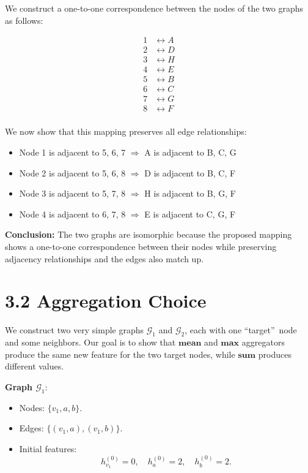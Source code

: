 \documentclass[a4paper,12pt]{article}
\begin{document}
We construct a one-to-one correspondence between the nodes of the two graphs as follows:

\[
\begin{aligned}
1 &\leftrightarrow A \\
2 &\leftrightarrow D \\
3 &\leftrightarrow H \\
4 &\leftrightarrow E \\
5 &\leftrightarrow B \\
6 &\leftrightarrow C \\
7 &\leftrightarrow G \\
8 &\leftrightarrow F \\
\end{aligned}
\]

We now show that this mapping preserves all edge relationships:

\begin{itemize}
    \item Node 1 is adjacent to 5, 6, 7 \(\Rightarrow\) A is adjacent to B, C, G
    \item Node 2 is adjacent to 5, 6, 8 \(\Rightarrow\) D is adjacent to B, C, F
    \item Node 3 is adjacent to 5, 7, 8 \(\Rightarrow\) H is adjacent to B, G, F
    \item Node 4 is adjacent to 6, 7, 8 \(\Rightarrow\) E is adjacent to C, G, F
\end{itemize}

\textbf{Conclusion:} The two graphs are isomorphic because the proposed mapping shows a one-to-one correspondence between their nodes while preserving adjacency relationships and the edges also match up.



\section*{3.2 Aggregation Choice}

We construct two very simple graphs \(\mathcal{G}_1\) and \(\mathcal{G}_2\), each with one 
\textquotedblleft target\textquotedblright\ node and some neighbors. Our goal is to show that 
\(\textbf{mean}\) and \(\textbf{max}\) aggregators produce the same new feature for the two 
target nodes, while \(\textbf{sum}\) produces different values.

\textbf{Graph \(\mathcal{G}_1\)}:
\begin{itemize}
    \item Nodes: \( \{v_1, a, b\} \).
    \item Edges: \(\{(v_1, a), (v_1, b)\}\).
    \item Initial features: 
    \[
    h^{(0)}_{v_1} = 0,\quad h^{(0)}_{a} = 2,\quad h^{(0)}_{b} = 2.
    \]
\end{itemize}
\end{document}
